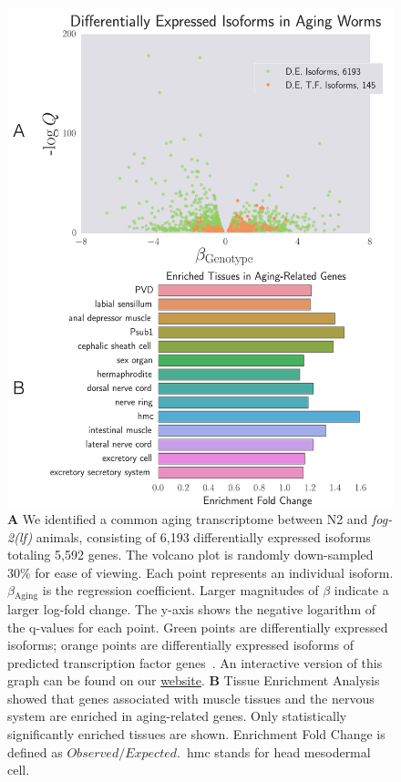 \documentclass[10pt,letterpaper,twocolumn]{article}
\newcommand{\fog}{\emph{\mbox{fog-2(lf)}}}
\newcommand{\agen}{5,592}
\newcommand{\webref}{
\href{https://wormlabcaltech.github.io/Angeles_Leighton_2016/}{website}}
\begin{document}
\begin{figure}[htbp]
\renewcommand{\familydefault}{\sfdefault}\normalfont{}
\centering
\includegraphics[width=\linewidth]{../../output/figs/final_figs/aging_transcriptomics.pdf}
\caption{\textbf{A} We identified a common aging transcriptome between N2 and
\fog{} animals, consisting of 6,193 differentially expressed isoforms totaling
\agen{} genes. The volcano plot is randomly down-sampled 30\% for ease of
viewing. Each point represents an individual isoform. $\beta{}_\mathrm{Aging}$
is the regression coefficient. Larger magnitudes of $\beta$ indicate a larger
log-fold change. The y-axis shows the negative logarithm of the q-values for
each point. Green points are differentially expressed isoforms; orange points
are differentially expressed isoforms of  predicted transcription factor
genes~\cite{Reece-Hoyes2005}. An interactive version of this graph can be found
on our \webref{}. \textbf{B} Tissue Enrichment
Analysis~\cite{Angeles-Albores2016} showed that genes associated with muscle
tissues and the nervous system are enriched in aging-related genes.
Only statistically significantly enriched tissues are shown. Enrichment Fold
Change is defined as $Observed/Expected$.\ hmc stands for head mesodermal cell.
}
\label{fig:agingtranscriptome}
\end{figure}
\end{document}
